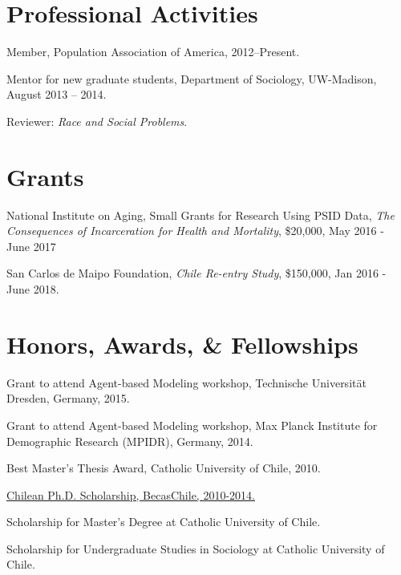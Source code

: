 \documentclass[10pt,letterpaper]{article}
\renewenvironment{itemize}{
  \begin{list}{}{
    \setlength{\leftmargin}{1.5em}
    \setlength{\itemsep}{0.25em}
    \setlength{\parskip}{0pt}
    \setlength{\parsep}{0.25em}
  }
}{
  \end{list}
}
\begin{document}
\section*{Professional Activities}

\begin{itemize}
\item Member, Population Association of America, 2012--Present.
\item Mentor for new graduate students, Department of Sociology, UW-Madison,
August 2013 – 2014.
\item Reviewer: \textit{Race and Social Problems}.
\end{itemize}

\section*{Grants}

\begin{itemize}
\item National Institute on Aging, Small Grants for Research Using PSID Data, \textit{The Consequences of Incarceration for Health and Mortality},  \$20,000, May 2016 - June 2017
\item San Carlos de Maipo Foundation, \textit{Chile Re-entry Study}, \$150,000, Jan 2016 - June 2018.
\end{itemize}


\section*{Honors, Awards, \& Fellowships}

\begin{itemize}
\item Grant to attend Agent-based Modeling workshop, Technische Universität Dresden, Germany, 2015.
\item Grant to attend Agent-based Modeling workshop, Max Planck Institute for Demographic Research (MPIDR), Germany, 2014.
\item Best Master's Thesis Award, Catholic University of Chile, 2010.
\item \href{http://www.becaschile.cl}{Chilean Ph.D. Scholarship, BecasChile, 2010-2014.}
\item Scholarship for Master’s Degree at Catholic University of Chile.
\item Scholarship for Undergraduate Studies in Sociology at Catholic University of Chile.
\end{itemize}
\end{document}
